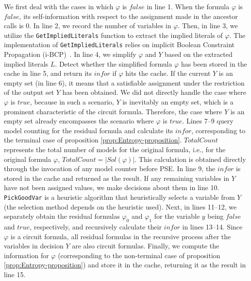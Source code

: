 We first deal with the cases in which $\varphi$ is $\mathit{false}$ in line 1.  
When the formula $\varphi$ is $\mathit{false}$, its self-information with respect to the assignment made in the ancestor calls is 0.
In line 2, we record the number of variables in $\varphi$. 
Then, in line 3, we utilize the \texttt{GetImpliedLiterals} function to extract the implied literals of $\varphi$.
The implementation of \texttt{GetImpliedLiterals} relies on implicit Boolean Constraint Propagation (i-BCP)~\cite{thurley2006sharpsat}. 
In line 4, we simplify $\varphi$ and $Y$ based on the extracted implied literals $L$.
Detect whether the simplified formula $\varphi$ has been stored  in the cache in line 5, and return its $\mathit{infor}$ if $\varphi$ hits the cache.
If the current $Y$ is an empty set (in line 6), it means that a satisfiable assignment under the restriction of the output set $Y$ has been obtained. 
We did not directly handle the case where $\varphi$ is  $\mathit{true}$, because in such a scenario, $Y$ is inevitably an empty set, which is a prominent characteristic of the circuit formula. 
Therefore, the case where $Y$ is an empty set already encompasses the scenario where $\varphi$ is $\mathit{true}$.
Lines 7--9 query model counting for the residual formula and calculate its $\mathit{infor}$, corresponding to the terminal case of proposition \ref{prop:Entropy-proposition}.
$TotalCount$ represents the total number of models for the original formula, i.e., for the original formula $\varphi$, $TotalCount= |\mathit{Sol}(\varphi)|$. 
This calculation is obtained directly through the invocation of any model counter before PSE.
In line 9, the $\mathit{infor}$ is stored in the cache and returned as the result.
If any remaining variables in $Y$ have not been assigned values, we make decisions about them in line 10.
\texttt{PickGoodVar} is a heuristic algorithm that heuristically selects a variable from $Y$ (the selection method depends on the heuristic used).
Next, in lines 11--12, we separately obtain the residual formulas $\varphi_0$ and $\varphi_1$ for the variable $y$ being $\mathit{false}$ and $\mathit{true}$, respectively, and recursively calculate their $\mathit{infor}$ in lines 13--14.
Since $\varphi$ is a circuit formula, all residual formulas in the recursive process after the variables in decision $Y$ are also circuit formulas.
Finally, we compute the information for $\varphi$ (corresponding to the non-terminal case of proposition \ref{prop:Entropy-proposition}) and store it in the cache, returning it as the result in line 15.


